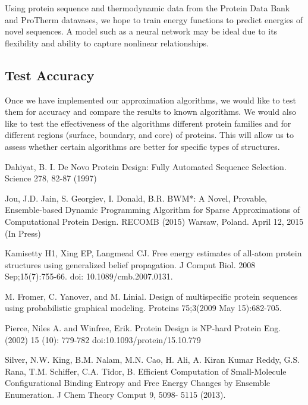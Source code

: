 \documentclass[11pt]{article}
\begin{document}
	Using protein sequence and thermodynamic data from the Protein Data Bank and
	ProTherm datavases, we hope to train energy functions to predict energies of
	novel sequences. A model such as a neural network may be ideal due to its 
	flexibility and ability to capture nonlinear relationships.
	
	
	\subsection{Test Accuracy}
	
	Once we have implemented our approximation algorithms, we would like to test
	them for accuracy and compare the results to known algorithms.  We would also
	like to test the effectiveness of the algorithms different protein families
	and for different regions (surface, boundary, and core) of proteins.  This
	will allow us to assess whether certain algorithms are better for specific
	types of structures.
	
	\begin{thebibliography}{99}
		 Dahiyat, B. I. De Novo Protein Design: Fully Automated Sequence
		Selection. Science 278, 82-87 (1997)
		
		 Jou, J.D. Jain, S. Georgiev, I. Donald, B.R. BWM*: A Novel,
		Provable, Ensemble-based Dynamic Programming Algorithm for Sparse 
		Approximations of Computational Protein Design. RECOMB (2015) Warsaw, Poland.
		April 12, 2015 (In Press)
		
		 Kamisetty H1, Xing EP, Langmead CJ. Free energy estimates of
		all-atom protein structures using generalized belief propagation. J Comput
		Biol. 2008 Sep;15(7):755-66. doi: 10.1089/cmb.2007.0131.
		
		 M. Fromer, C. Yanover, and M. Linial. Design of multispecific
		protein sequences using probabilistic graphical modeling. Proteins 75;3(2009
		May 15):682-705.
		
		 Pierce, Niles A. and Winfree, Erik. Protein Design is NP-hard 
		Protein Eng. (2002) 15 (10): 779-782 doi:10.1093/protein/15.10.779
		
		 Silver, N.W. King, B.M. Nalam, M.N. Cao, H. Ali, 
		A. Kiran Kumar Reddy, G.S. Rana, T.M. Schiffer, C.A. Tidor, B. Efficient
		Computation of Small-Molecule Configurational Binding Entropy and Free
		Energy Changes by Ensemble Enumeration. J Chem Theory Comput 9, 5098-
		5115 (2013).
		
	\end{thebibliography}
	
	
\end{document}
